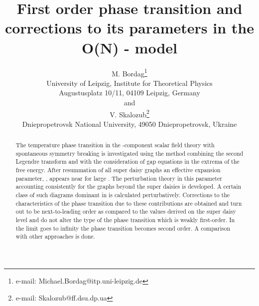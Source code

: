 \documentclass[a4paper,12pt]{article}
\begin{document}
\title{First order phase transition  and corrections to
  its parameters in the O(N) - model}
\author{
{\sc M. Bordag}\thanks{e-mail: Michael.Bordag@itp.uni-leipzig.de} \\
\small  University of Leipzig, Institute for Theoretical Physics\\
\small  Augustusplatz 10/11, 04109 Leipzig, Germany\\
\small and\\
{\sc V. Skalozub}\thanks{e-mail: Skalozub@ff.dsu.dp.ua}\\
\small  Dniepropetrovsk National University, 49050 Dniepropetrovsk, Ukraine}
\maketitle
\begin{abstract}
The temperature phase transition in the \coordHE{}-component scalar field
theory with spontaneous symmetry breaking is investigated using the
method combining the second Legendre transform and with the
consideration of gap equations in the extrema of the free
energy. After resummation of all super daisy graphs an effective
expansion parameter, \coordHE{}, appears near \coordHE{} for large \coordHE{}.
The perturbation theory in this parameter accounting consistently for
the graphs beyond the super daisies is developed.  A certain class of
such diagrams dominant in \coordHE{} is calculated
perturbatively. Corrections to the characteristics of the phase
transition due to these contributions are obtained and turn out to be
next-to-leading order as compared to the values derived on the super
daisy level and do not alter the type of the phase transition which is
weakly first-order.  In the limit \coordHE{} goes to infinity the phase
transition becomes second order.  A comparison with other approaches
is done.
\end{abstract}
\end{document}
